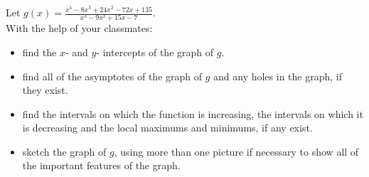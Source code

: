 \documentclass{ximera}
\begin{document}
\begin{problem}
\begin{question}
\end{question}

\end{problem}

\begin{problem}
\begin{question}
  Let $g(x) = \displaystyle \frac{x^{4} - 8x^{3} + 24x^{2} - 72x + 135}{x^{3} - 9x^{2} + 15x - 7}.\;$  
  \\
  With the help of your classmates:
  \begin{itemize}
    \item  find the $x$- and $y$- intercepts of the graph of $g$.
    \item   find all of the asymptotes of the graph of $g$ and any holes in the graph, if they exist.
    \item find the intervals on which the function is increasing, the intervals on which it is decreasing and the local maximums and minimums, if any exist.
    \item sketch the graph of $g$, using more than one picture if necessary to show all of the important features of the graph.
  \end{itemize}
\end{question}
\end{problem}
\end{document}
